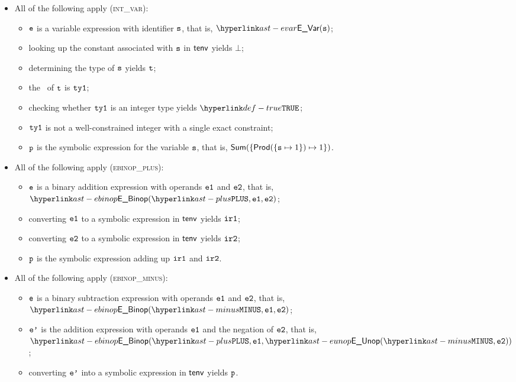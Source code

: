 \begin{itemize}
  \item All of the following apply (\textsc{int\_var}):
  \begin{itemize}
    \item $\texttt{e}$ is a variable expression with identifier $\texttt{s}$, that is, $\EVar(\vs)$;
    \item looking up the constant associated with $\texttt{s}$ in $\textsf{tenv}$ yields $\bot$;
    \item determining the type of $\texttt{s}$ yields $\texttt{t}$\ProseOrTypeError;
    \item the \underlyingtype\ of $\texttt{t}$ is $\texttt{ty1}$\ProseOrTypeError;
    \item checking whether $\texttt{ty1}$ is an integer type yields $\True$\ProseOrTypeError;
    \item $\texttt{ty1}$ is not a well-constrained integer with a single exact constraint;
    \item $\texttt{p}$ is the symbolic expression for the variable $\texttt{s}$, that is, $\textsf{Sum}( \{ \textsf{Prod}(\{\texttt{s}\mapsto 1\})\mapsto 1 \} )$.
  \end{itemize}

  \item All of the following apply (\textsc{ebinop\_plus}):
  \begin{itemize}
    \item $\texttt{e}$ is a binary addition expression with operands $\texttt{e1}$ and $\texttt{e2}$, that is, \\ $\EBinop(\PLUS, \veone, \vetwo)$;
    \item converting $\texttt{e1}$ to a symbolic expression in $\textsf{tenv}$ yields $\texttt{ir1}$\ProseOrTypeErrorOrBot;
    \item converting $\texttt{e2}$ to a symbolic expression in $\textsf{tenv}$ yields $\texttt{ir2}$\ProseOrTypeErrorOrBot;
    \item $\texttt{p}$ is the symbolic expression adding up $\texttt{ir1}$ and $\texttt{ir2}$.
  \end{itemize}

  \item All of the following apply (\textsc{ebinop\_minus}):
  \begin{itemize}
    \item $\texttt{e}$ is a binary subtraction expression with operands $\texttt{e1}$ and $\texttt{e2}$, that is, \\ $\EBinop(\MINUS, \veone, \vetwo)$;
    \item $\texttt{e'}$ is the addition expression with operands $\texttt{e1}$ and the negation of $\texttt{e2}$, that is, \\ $\EBinop(\PLUS, \veone, \EUnop(\MINUS, \vetwo))$;
    \item converting $\texttt{e'}$ into a symbolic expression in $\textsf{tenv}$ yields $\texttt{p}$\ProseOrTypeErrorOrBot.
  \end{itemize}


\end{itemize}
